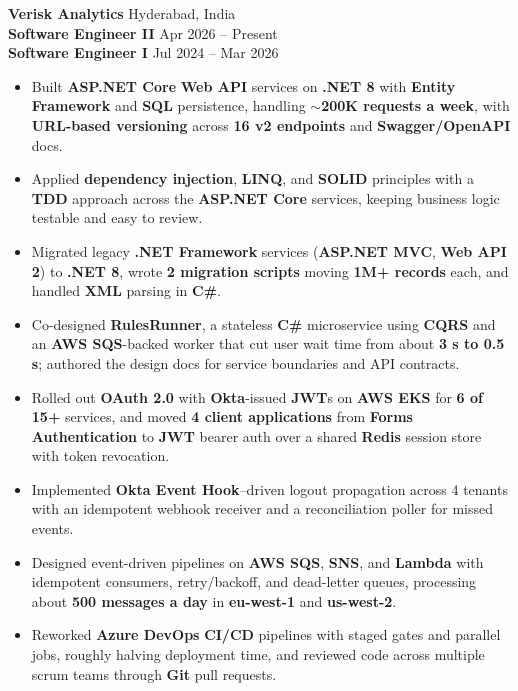 \documentclass[a4paper,10pt]{article}
\begin{document}
\textbf{Verisk Analytics} \hfill Hyderabad, India \\
\textbf{Software Engineer II} \hfill Apr 2026 -- Present \\
\textbf{Software Engineer I} \hfill Jul 2024 -- Mar 2026

\begin{itemize}[leftmargin=*]
    \item Built \textbf{ASP.NET Core} \textbf{Web API} services on \textbf{.NET 8} with \textbf{Entity Framework} and \textbf{SQL} persistence, handling \textbf{${\sim}$200K requests a week}, with \textbf{URL-based versioning} across \textbf{16 v2 endpoints} and \textbf{Swagger/OpenAPI} docs.
    \item Applied \textbf{dependency injection}, \textbf{LINQ}, and \textbf{SOLID} principles with a \textbf{TDD} approach across the \textbf{ASP.NET Core} services, keeping business logic testable and easy to review.
    \item Migrated legacy \textbf{.NET Framework} services (\textbf{ASP.NET MVC}, \textbf{Web API 2}) to \textbf{.NET 8}, wrote \textbf{2 migration scripts} moving \textbf{1M+ records} each, and handled \textbf{XML} parsing in \textbf{C\#}.
    \item Co-designed \textbf{RulesRunner}, a stateless \textbf{C\#} microservice using \textbf{CQRS} and an \textbf{AWS SQS}-backed worker that cut user wait time from about \textbf{3 s to 0.5 s}; authored the design docs for service boundaries and API contracts.
    \item Rolled out \textbf{OAuth 2.0} with \textbf{Okta}-issued \textbf{JWT}s on \textbf{AWS EKS} for \textbf{6 of 15+} services, and moved \textbf{4 client applications} from \textbf{Forms Authentication} to \textbf{JWT} bearer auth over a shared \textbf{Redis} session store with token revocation.
    \item Implemented \textbf{Okta Event Hook}--driven logout propagation across 4 tenants with an idempotent webhook receiver and a reconciliation poller for missed events.
    \item Designed event-driven pipelines on \textbf{AWS SQS}, \textbf{SNS}, and \textbf{Lambda} with idempotent consumers, retry/backoff, and dead-letter queues, processing about \textbf{500 messages a day} in \textbf{eu-west-1} and \textbf{us-west-2}.
    \item Reworked \textbf{Azure DevOps} \textbf{CI/CD} pipelines with staged gates and parallel jobs, roughly halving deployment time, and reviewed code across multiple scrum teams through \textbf{Git} pull requests.

\end{itemize}
\end{document}
